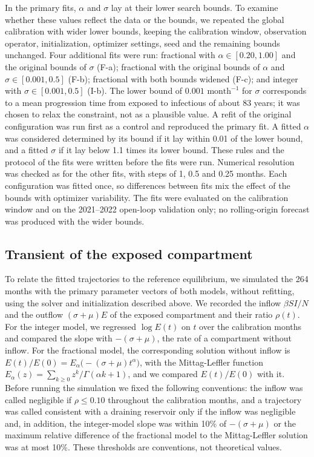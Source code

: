 \documentclass[pdflatex,sn-mathphys-ay]{sn-jnl}
\begin{document}
In the primary fits, $\alpha$ and $\sigma$ lay at their lower search bounds. To examine whether these values reflect the data or the bounds, we repeated the global calibration with wider lower bounds, keeping the calibration window, observation operator, initialization, optimizer settings, seed and the remaining bounds unchanged. Four additional fits were run: fractional with $\alpha\in[0.20,1.00]$ and the original bounds of $\sigma$ (F-a); fractional with the original bounds of $\alpha$ and $\sigma\in[0.001,0.5]$ (F-b); fractional with both bounds widened (F-c); and integer with $\sigma\in[0.001,0.5]$ (I-b). The lower bound of $0.001\text{ month}^{-1}$ for $\sigma$ corresponds to a mean progression time from exposed to infectious of about 83 years; it was chosen to relax the constraint, not as a plausible value. A refit of the original configuration was run first as a control and reproduced the primary fit. A fitted $\alpha$ was considered determined by its bound if it lay within 0.01 of the lower bound, and a fitted $\sigma$ if it lay below 1.1 times its lower bound. These rules and the protocol of the fits were written before the fits were run. Numerical resolution was checked as for the other fits, with steps of 1, 0.5 and 0.25 months. Each configuration was fitted once, so differences between fits mix the effect of the bounds with optimizer variability. The fits were evaluated on the calibration window and on the 2021--2022 open-loop validation only; no rolling-origin forecast was produced with the wider bounds.

\subsection{Transient of the exposed compartment}\label{sec:transmethods}

To relate the fitted trajectories to the reference equilibrium, we simulated the 264 months with the primary parameter vectors of both models, without refitting, using the solver and initialization described above. We recorded the inflow $\beta SI/N$ and the outflow $(\sigma+\mu)E$ of the exposed compartment and their ratio $\rho(t)$. For the integer model, we regressed $\log E(t)$ on $t$ over the calibration months and compared the slope with $-(\sigma+\mu)$, the rate of a compartment without inflow. For the fractional model, the corresponding solution without inflow is $E(t)/E(0)=E_\alpha\bigl(-(\sigma+\mu)t^\alpha\bigr)$, with the Mittag-Leffler function $E_\alpha(z)=\sum_{k\ge0}z^k/\Gamma(\alpha k+1)$, and we compared $E(t)/E(0)$ with it. Before running the simulation we fixed the following conventions: the inflow was called negligible if $\rho\le0.10$ throughout the calibration months, and a trajectory was called consistent with a draining reservoir only if the inflow was negligible and, in addition, the integer-model slope was within 10\% of $-(\sigma+\mu)$ or the maximum relative difference of the fractional model to the Mittag-Leffler solution was at most 10\%. These thresholds are conventions, not theoretical values.
\end{document}
